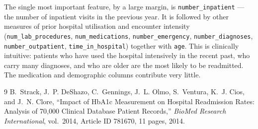 \documentclass[11pt,a4paper]{article}
\begin{document}
The single most important feature, by a large margin, is \texttt{number\_inpatient} ---
the number of inpatient visits in the previous year. It is followed by other measures of
prior hospital utilisation and encounter intensity (\texttt{num\_lab\_procedures},
\texttt{num\_medications}, \texttt{number\_emergency}, \texttt{number\_diagnoses},
\texttt{number\_outpatient}, \texttt{time\_in\_hospital}) together with \texttt{age}.
This is clinically intuitive: patients who have used the hospital intensively in the
recent past, who carry many diagnoses, and who are older are the most likely to be
readmitted. The medication and demographic columns contribute very little.


\begin{thebibliography}{9}
B.~Strack, J.~P. DeShazo, C.~Gennings, J.~L. Olmo, S.~Ventura, K.~J. Cios, and J.~N. Clore,
``Impact of HbA1c Measurement on Hospital Readmission Rates: Analysis of 70,000 Clinical Database Patient Records,''
\emph{BioMed Research International}, vol.~2014, Article ID 781670, 11 pages, 2014.
\end{thebibliography}
\end{document}
